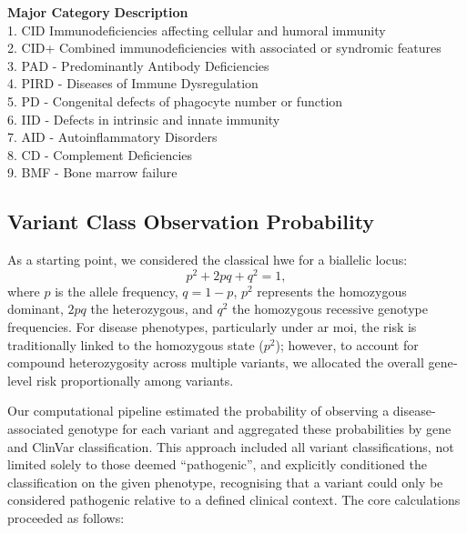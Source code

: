 \begin{tcolorbox}[colback=black!01, colframe=black!70, title=Box \ref{box:definitions} Definitions for IEI Major Disease Categories, label=box:definitions]
\textbf{Major Category} \hspace{4em} \textbf{Description}\\[5pt]
1. CID  Immunodeficiencies affecting cellular and humoral immunity\\[2pt]
2. CID+  Combined immunodeficiencies with associated or syndromic features\\[2pt]
3. PAD - Predominantly Antibody Deficiencies\\[2pt]
4. PIRD - Diseases of Immune Dysregulation\\[2pt]
5. PD - Congenital defects of phagocyte number or function\\[2pt]
6. IID - Defects in intrinsic and innate immunity\\[2pt]
7. AID - Autoinflammatory Disorders\\[2pt]
8. CD - Complement Deficiencies\\[2pt]
9. BMF - Bone marrow failure
\end{tcolorbox}

\subsection{Variant Class Observation Probability}
As a starting point, we considered the classical \ac{hwe} for a biallelic locus:
\[
p^2 + 2pq + q^2 = 1,
\]
where \(p\) is the allele frequency, \(q = 1 - p\), \(p^2\) represents the homozygous dominant, \(2pq\) the heterozygous, and \(q^2\) the homozygous recessive genotype frequencies. For disease phenotypes, particularly under \ac{ar} \ac{moi}, the risk is traditionally linked to the homozygous state (\(p^2\)); however, to account for compound heterozygosity across multiple variants, %
we allocated the overall gene‐level risk proportionally among variants.

Our computational pipeline estimated the probability of observing a disease-associated genotype for each variant and aggregated these probabilities by gene and ClinVar classification. This approach included all variant classifications, not limited solely to those deemed ``pathogenic'', and explicitly conditioned the classification on the given phenotype, recognising that a variant could only be considered pathogenic relative to a defined clinical context. The core calculations proceeded as follows:

